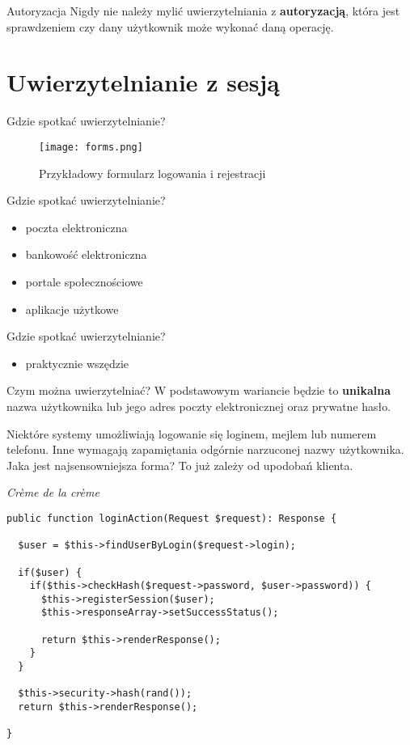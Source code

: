 \begin{frame}{Autoryzacja}
	Nigdy nie należy mylić uwierzytelniania z \textbf{autoryzacją}, która jest sprawdzeniem czy dany użytkownik może wykonać daną operację.
\end{frame}

\section{Uwierzytelnianie z sesją}

\begin{frame}{Gdzie spotkać uwierzytelnianie?}
	\begin{figure}[t]
		\centering
		\texttt{[image: forms.png]}
		\caption{Przykładowy formularz logowania i rejestracji}
	\end{figure}
\end{frame}

\begin{frame}{Gdzie spotkać uwierzytelnianie?}
	\begin{itemize}
		\item poczta elektroniczna
		\item bankowość elektroniczna
		\item portale społecznościowe
		\item aplikacje użytkowe
	\end{itemize}
\end{frame}

\begin{frame}{Gdzie spotkać uwierzytelnianie?}
	\begin{itemize}
		\item praktycznie wszędzie
	\end{itemize}
\end{frame}

\begin{frame}{Czym można uwierzytelniać?}
	W podstawowym wariancie będzie to \textbf{unikalna} nazwa użytkownika lub jego adres poczty elektronicznej oraz prywatne hasło.
	
	Niektóre systemy umożliwiają logowanie się loginem, mejlem lub numerem telefonu. Inne wymagają zapamiętania odgórnie narzuconej nazwy użytkownika. Jaka jest najsensowniejsza forma? To już zależy od upodobań klienta.
\end{frame}

\begin{frame}[fragile]{\emph{Crème de la crème}}
	\begin{lstlisting}
public function loginAction(Request $request): Response {

  $user = $this->findUserByLogin($request->login);

  if($user) {
    if($this->checkHash($request->password, $user->password)) {
      $this->registerSession($user);
      $this->responseArray->setSuccessStatus();

      return $this->renderResponse();
    }
  }

  $this->security->hash(rand());
  return $this->renderResponse();

}
	\end{lstlisting}
\end{frame}

